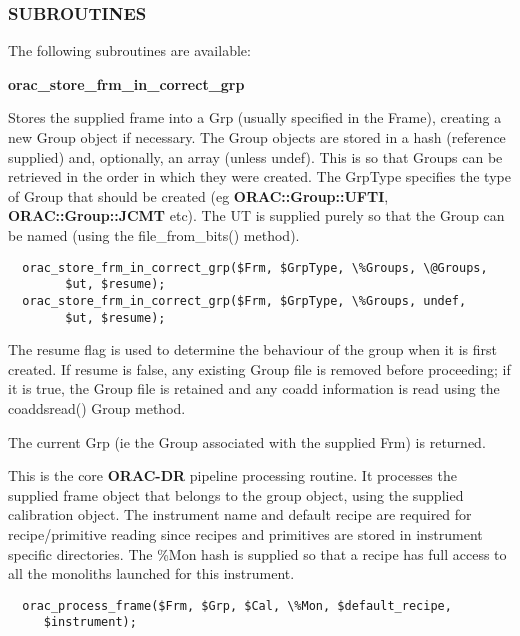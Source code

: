 \subsubsection*{SUBROUTINES\label{ORAC::Core_SUBROUTINES}}

The following subroutines are available:

\begin{description}
\item \textbf{\textbf{orac\_store\_frm\_in\_correct\_grp}}

Stores the supplied frame into a Grp (usually specified in the Frame),
creating a new Group object if necessary. The Group objects are stored
in a hash (reference supplied) and, optionally, an array (unless undef).
This is so that Groups can be retrieved in the order in which they
were created. The GrpType specifies the type of Group that should be
created (eg \textbf{ORAC::Group::UFTI}, \textbf{ORAC::Group::JCMT} etc). The UT
is supplied purely so that the Group can be named (using the 
file\_from\_bits() method).

\begin{verbatim}
  orac_store_frm_in_correct_grp($Frm, $GrpType, \%Groups, \@Groups,
        $ut, $resume);
  orac_store_frm_in_correct_grp($Frm, $GrpType, \%Groups, undef, 
        $ut, $resume);
\end{verbatim}


The resume flag is used to determine the behaviour of the group when
it is first created. If resume is false, any existing Group file is 
removed before proceeding; if it is true, the Group file is retained
and any coadd information is read using the coaddsread() Group
method.



The current Grp (ie the Group associated with the supplied Frm)
is returned.

\item[\textbf{orac\_process\_frame}] \mbox{}

This is the core \textbf{ORAC-DR} pipeline processing routine.
It processes the supplied frame object that belongs to the group object,
using the supplied calibration object. The instrument name and default
recipe are required for recipe/primitive reading since recipes and
primitives are stored in instrument specific directories.
The \%Mon hash is supplied so that a recipe has full access to
all the monoliths launched for this instrument.

\begin{verbatim}
  orac_process_frame($Frm, $Grp, $Cal, \%Mon, $default_recipe, 
     $instrument);
\end{verbatim}
\end{description}
